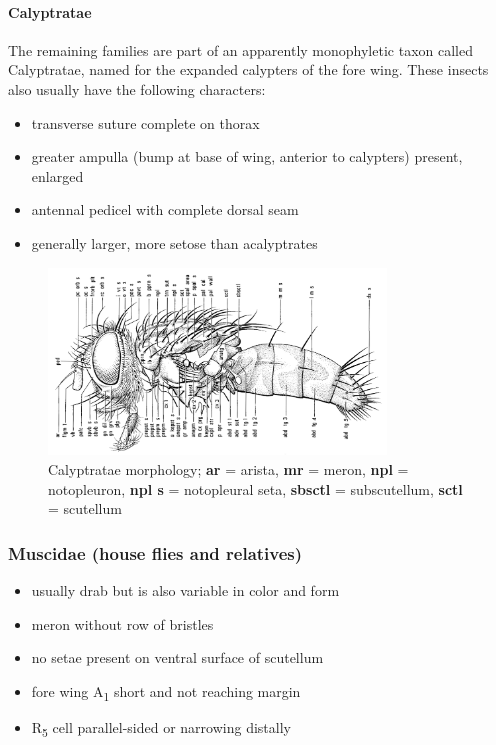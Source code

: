 \documentclass[letterpaper, 11pt]{article}
\begin{document}
\paragraph{Calyptratae} The remaining families are part of an apparently monophyletic taxon called Calyptratae, named for the expanded calypters of the fore wing. These insects also usually have the following characters:
\begin{itemize}
\item transverse suture complete on thorax
\item greater ampulla (bump at base of wing, anterior to calypters) present, enlarged 
\item antennal pedicel with complete dorsal seam
\item generally larger, more setose than acalyptrates
\end{itemize}

\begin{figure}[ht!]
  \centering
    \includegraphics[width=0.8\textwidth]{CalyptrateMorph}
  \caption{Calyptratae morphology; \textbf{ar} = arista, \textbf{mr} = meron, \textbf{npl} = notopleuron, \textbf{npl s} = notopleural seta, \textbf{sbsctl} = subscutellum, \textbf{sctl} = scutellum \citep[][Fig. 2.66]{mcalpine1981manual}}
  \label{fig:calyptratemorph}
\end{figure}

\subsubsection{Muscidae (house flies and relatives)}
\begin{itemize}
\item usually drab but is also variable in color and form
\item meron without row of bristles
\item no setae present on ventral surface of scutellum
\item fore wing \texorpdfstring{A\textsubscript{1}}{A1} short and not reaching margin
\item \texorpdfstring{R\textsubscript{5}}{R5} cell parallel-sided or narrowing distally
\end{itemize}
\end{document}
